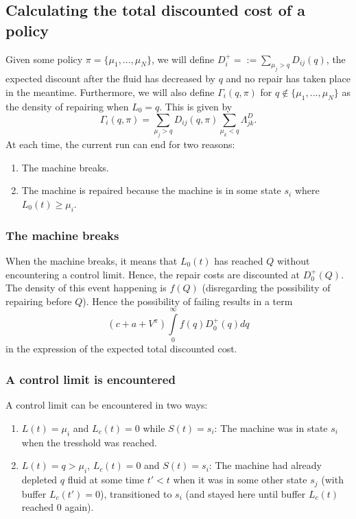 \subsection{Calculating the total discounted cost of a policy}
Given some policy $\pi=\{\mu_1,...,\mu_N\}$, we will define $D^+_i=:=\sum\limits_{\mu_j>q}D_{ij}(q)$, the expected discount after the fluid has decreased by $q$ and no repair has taken place in the meantime.
Furthermore, we will also define $\Gamma_{i}(q,\pi)$ for $q\not\in\{\mu_1,...,\mu_N\}$ as the density of repairing when $L_0=q$.
This is given by
\begin{equation}
\Gamma_{i}(q,\pi)=\sum\limits_{\mu_j>q}D_{ij}(q,\pi)\sum\limits_{\mu_k<q}\Lambda_{jk}^D.
\end{equation}
At each time, the current run can end for two reasons:
\begin{enumerate}
\item The machine breaks.
\item The machine is repaired because the machine is in some state $s_i$ where $L_0(t)\geq \mu_i$.
\end{enumerate}
\subsubsection{The machine breaks}
When the machine breaks, it means that $L_0(t)$ has reached $Q$ without encountering a control limit.
Hence, the repair costs are discounted at $D_0^+(Q)$.
The density of this event happening is $f(Q)$ (disregarding the possibility of repairing before $Q$).
Hence the possibility of failing results in a term 
$$
(c+a+V^{\pi})\int\limits_0^\infty f(q)D_0^+(q)dq
$$
in the expression of the expected total discounted cost.

\subsubsection{A control limit is encountered}
A control limit can be encountered in two ways:
\begin{enumerate}
\item $L(t)=\mu_i$ and $L_c(t)=0$ while $S(t)=s_i$: The machine was in state $s_i$ when the tresshold was reached.
\item $L(t)=q>\mu_i$, $L_c(t)=0$ and $S(t)=s_i$: The machine had already depleted $q$ fluid at some time $t'<t$ when it was in some other state $s_j$ (with buffer $L_c(t')=0$), transitioned to $s_i$ (and stayed here until buffer $L_c(t)$ reached $0$ again). 
\end{enumerate}

